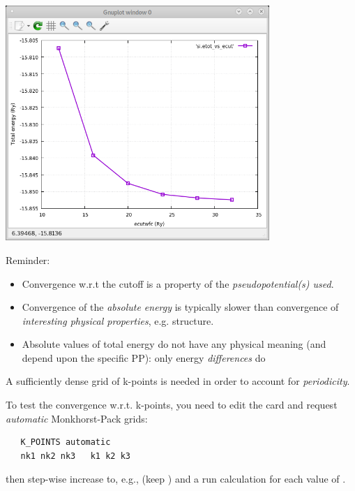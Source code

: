 \documentclass[landscape]{foils}
\begin{document}
%
\begin{center}
\includegraphics[width=10cm]{figs/ecut.png}
\end{center}
\vspace{-2cm}
{\red Reminder:}
\begin{itemize}
\item Convergence w.r.t the cutoff is a property of the {\em pseudopotential(s) used}.
\item 
Convergence of the {\em absolute energy} is typically slower than convergence of
{\em interesting physical properties}, e.g. structure.
\item 
Absolute values of total energy do not have any physical meaning 
(and depend upon the specific PP): only energy {\em differences} do
\end{itemize}

%
A sufficiently dense grid of k-points is needed in order to account
for {\em periodicity}.

To test the convergence w.r.t. k-points, you need to edit
the  card and request {\em automatic} Monkhorst-Pack
grids:
%
{\cardcolor
\begin{verbatim}
   K_POINTS automatic
   nk1 nk2 nk3   k1 k2 k3
\end{verbatim}
}
then step-wise increase  to, e.g., 
(keep ) and a run  calculation for each
value of .
\end{document}
